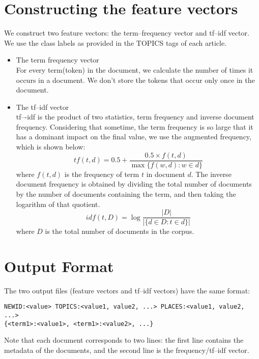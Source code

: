 \documentclass{article}
\begin{document}
\section{Constructing the feature vectors}
We construct two feature vectors: the term--frequency vector and tf--idf vector.
We use the class labels as provided in the TOPICS tags of each article.
\begin{itemize}
  \item The term frequency vector \\
  For every term(token) in the document, we calculate the number of times it
  occurs in a document. We don't store the tokens that occur only once in the
  document.
  \item The tf--idf vector \\
  tf–-idf is the product of two statistics, term frequency and inverse document
  frequency.
  Considering that sometime, the term frequency is so large that it has a
  dominant impact on the final value, we use the augmented frequency, which is
  shown below:
  \begin{equation}
  \mathit{tf}(t,d) = 0.5 + \frac{0.5 \times f(t,d)}{\max\{f(w,d):w \in
  d\}}
  \end{equation}
  where $f(t,d)$ is the frequency of term $t$ in document $d$.
  The inverse document frequency is obtained by dividing the total number of
  documents by the number of documents containing the term, and then taking the
  logarithm of that quotient.
  \begin{equation}
  idf(t, D) = \log\frac{|D|}{|\{d \in D: t \in d\}|}  
  \end{equation}
  where $D$ is the total number of documents in the corpus.
\end{itemize}

\section{Output Format}
The two output files (feature vectors and tf--idf vectors) have the same format:
\begin{verbatim}
NEWID:<value> TOPICS:<value1, value2, ...> PLACES:<value1, value2, ...>
{<term1>:<value1>, <term1>:<value2>, ...}
\end{verbatim}
\noindent
Note that each document corresponds to two lines: the first line contains the
metadata of the documents, and the second line is the frequency/tf--idf vector.
\end{document}
